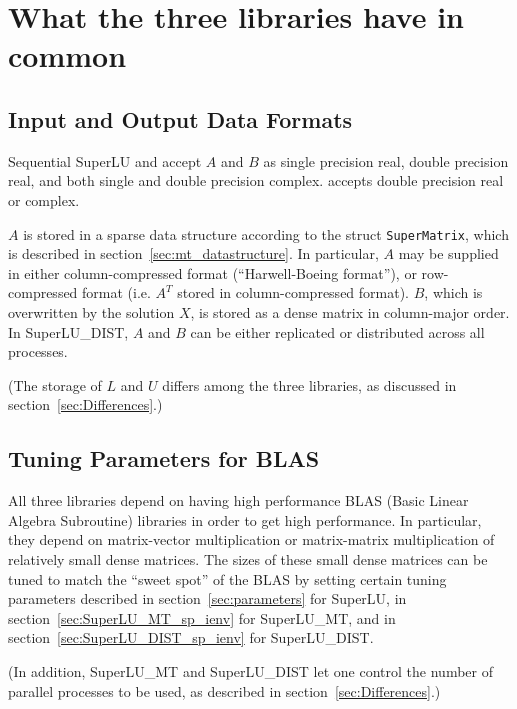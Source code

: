 \section{What the three libraries have in common}
\label{sec:Commonalities}


\subsection{Input and Output Data Formats}

Sequential SuperLU and {\superlumt} accept $A$ and $B$ as
single precision real, double precision real, and
both single and double precision complex.
{\superlud} accepts double precision real or complex.

$A$ is stored in a sparse data structure according to the struct 
{\tt SuperMatrix},
which is described in section~\ref{sec:mt_datastructure}.
In particular, $A$ may be supplied in either column-compressed format 
(``Harwell-Boeing format''), or row-compressed format 
(i.e. $A^T$ stored in column-compressed format).
$B$, which is overwritten by the solution $X$,
is stored as a dense matrix in column-major order.
In SuperLU\_DIST, $A$ and $B$ can be either replicated or
distributed across all processes.

(The storage of $L$ and $U$ differs among the three libraries, as discussed
in section~\ref{sec:Differences}.)

\subsection{Tuning Parameters for BLAS}

All three libraries depend on having high performance
BLAS (Basic Linear Algebra Subroutine) libraries 
\cite{blas1,blas2,blas3} in order to get high performance.
In particular, they depend on matrix-vector multiplication
or matrix-matrix multiplication
of relatively small dense matrices. The sizes of these
small dense matrices can be tuned to match the ``sweet spot''
of the BLAS by setting certain tuning parameters described
in section~\ref{sec:parameters} for SuperLU,
in section~\ref{sec:SuperLU_MT_sp_ienv} for SuperLU\_MT, and
in section~\ref{sec:SuperLU_DIST_sp_ienv} for SuperLU\_DIST.

(In addition, SuperLU\_MT and SuperLU\_DIST let one control
the number of parallel processes to be used, as described 
in section~\ref{sec:Differences}.)

